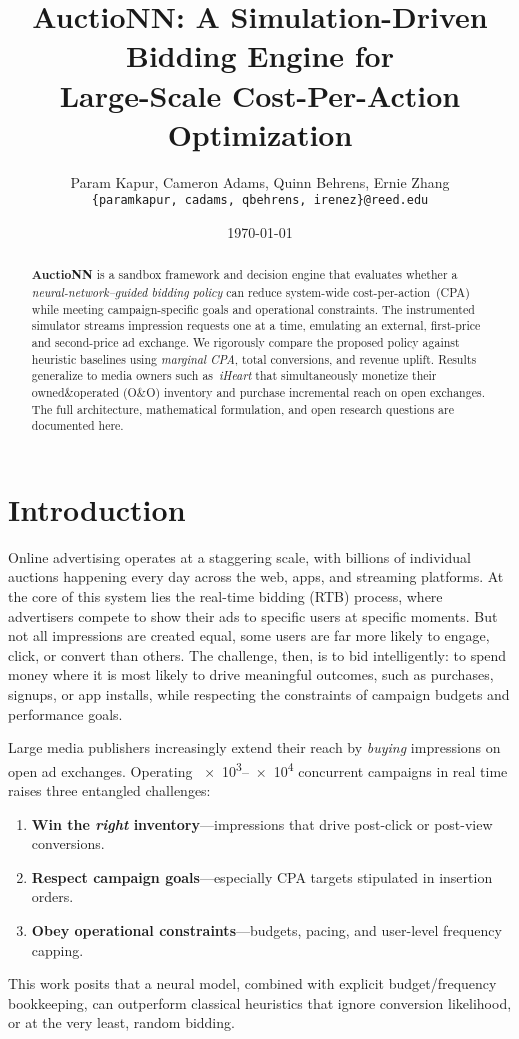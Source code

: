 \documentclass[11pt]{article}
\title{\bfseries AuctioNN: A Simulation-Driven Bidding Engine for\\
Large-Scale Cost-Per-Action Optimization}
\author{Param Kapur, Cameron Adams, Quinn Behrens, Ernie Zhang \\
\texttt{\{paramkapur, cadams, qbehrens, irenez\}@reed.edu}\\}
\date{\today}
\begin{document}
\maketitle
\vspace{-1em}

\begin{abstract}
  \noindent
  \textbf{AuctioNN} is a sandbox framework and decision engine that
  evaluates whether a \emph{neural-network–guided bidding policy} can
  reduce system-wide cost-per-action~(CPA) while meeting
  campaign-specific goals and operational constraints.  The
  instrumented simulator streams impression requests one at a time,
  emulating an external, first-price and second-price ad exchange.
  We rigorously
  compare the proposed policy against heuristic baselines using
  \emph{marginal CPA}, total conversions, and revenue uplift.
  Results generalize to media owners such as~\emph{iHeart} that
  simultaneously monetize their owned\&operated (O\&O) inventory and
  purchase incremental reach on open exchanges.  The full
  architecture, mathematical formulation, and open research questions
  are documented here. %
\end{abstract}

\section{Introduction}

Online advertising operates at a staggering scale, with billions of individual auctions happening every day across the web, apps, and streaming platforms. At the core of this system lies the real-time bidding (RTB) process, where advertisers compete to show their ads to specific users at specific moments. But not all impressions are created equal, some users are far more likely to engage, click, or convert than others. The challenge, then, is to bid intelligently: to spend money where it is most likely to drive meaningful outcomes, such as purchases, signups, or app installs, while respecting the constraints of campaign budgets and performance goals.

Large media publishers increasingly extend their reach by \emph{buying} impressions on open ad exchanges. Operating \num{e3}--\num{e4} concurrent campaigns in real time raises three entangled challenges:
\begin{enumerate}
  \item \textbf{Win the \emph{right} inventory}—impressions that
    drive post-click or post-view conversions.
  \item \textbf{Respect campaign goals}—especially CPA targets
    stipulated in insertion orders.
  \item \textbf{Obey operational constraints}—budgets, pacing, and
    user-level frequency capping.
\end{enumerate}
This work posits that a neural model, combined with explicit budget/frequency bookkeeping, can outperform classical heuristics that ignore conversion likelihood, or at the very least, random bidding.
\end{document}
